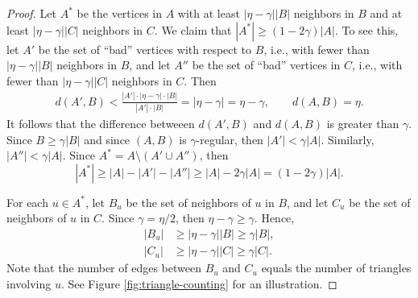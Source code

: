 \documentclass[letterpaper, reqno,11pt]{article}
\begin{document}
\begin{proof}
  Let $A^*$ be the vertices in $A$ with at least $|\eta - \gamma| |B|$ neighbors in $B$ and at least $|\eta - \gamma| |C|$ neighbors in $C$. We claim that $|A^*| \geq (1 - 2\gamma) |A|$. To see this, let $A'$ be the set of ``bad'' vertices with respect to $B$, i.e., with fewer than $|\eta - \gamma| |B|$ neighbors in $B$, and let $A''$ be the set of ``bad'' vertices in $C$, i.e., with fewer than $|\eta - \gamma| |C|$ neighbors in $C$. Then
  \begin{gather*}
    d\left(A', B\right) < \frac{\left|A'\right| \cdot |\eta - \gamma| \cdot |B|}{\left|A'\right| \cdot |B|} = |\eta - \gamma| = \eta - \gamma, \qquad d(A, B) = \eta.
  \end{gather*}
  It follows that the difference betweeen $d(A', B)$ and $d(A, B)$ is greater than $\gamma$. Since $B \geq \gamma |B|$ and since $(A, B)$ is $\gamma$-regular, then $|A'| < \gamma |A|$. Similarly, $|A''| < \gamma |A|$. Since $A^* = A \setminus (A' \cup A'')$, then
  $$ \left|A^*\right| \geq |A| - \left|A'\right| - \left|A''\right| \geq |A| - 2\gamma |A| = (1 - 2\gamma) |A|. $$

  For each $u \in A^*$, let $B_u$ be the set of neighbors of $u$ in $B$, and let $C_u$ be the set of neighbors of $u$ in $C$. Since $\gamma = \eta/2$, then $\eta - \gamma \geq \gamma$. Hence,
  \begin{align*}
    \left|B_u\right| &\geq |\eta - \gamma| |B| \geq \gamma |B|, \\
    \left|C_u\right| &\geq |\eta - \gamma| |C| \geq \gamma |C|.
  \end{align*}
  Note that the number of edges between $B_u$ and $C_u$ equals the number of triangles involving $u$. See Figure \ref{fig:triangle-counting} for an illustration.
  

\end{proof}
\end{document}
